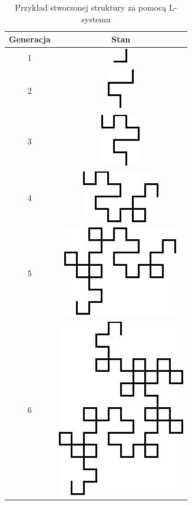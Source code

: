 \documentclass[a4paper,12pt,oneside]{book} %
\begin{document}
\begin{table}[h]
	\caption{Przykład stworzonej struktury za pomocą L-systemu}
	\label{tab:table3}
	\begin{center}
		\begin{tabular}{|c|c|}
			\hline
			Generacja & Stan \\ [0.5ex]
			\hline
			1 & \includegraphics[scale=0.7]{grafika/example1} \\
			\hline
			2 & \includegraphics[scale=0.7]{grafika/example2} \\
			\hline
			3 & \includegraphics[scale=0.7]{grafika/example3} \\
			\hline
			4 & \includegraphics[scale=0.7]{grafika/example4} \\
			\hline
			5 & \includegraphics[scale=0.7]{grafika/example5} \\
			\hline
			6 & \includegraphics[scale=0.7]{grafika/example6} \\

\end{tabular}
\end{center}
\end{table}
\end{document}
